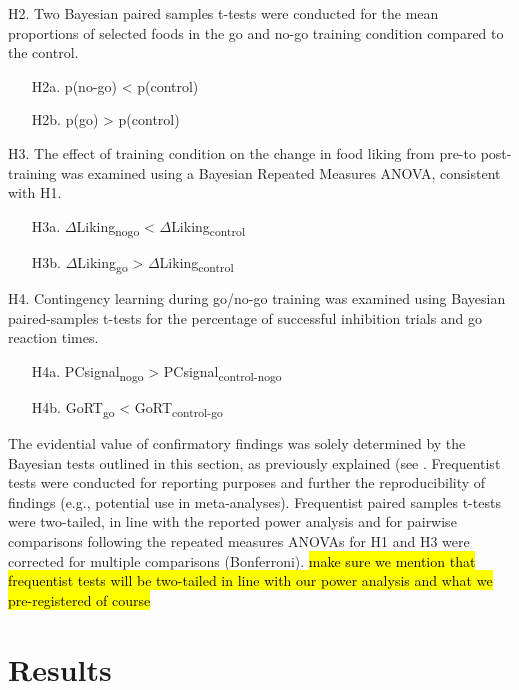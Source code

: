 \documentclass[man,floatsintext]{apa6}
\begin{document}
\noindent H2. Two Bayesian paired samples t-tests were conducted for the mean proportions of selected foods in the go and no-go training condition compared to the control.

\begin{itemize}
\item[H2a.] p(no-go) < p(control)
\item[H2b.] p(go) > p(control)
\end{itemize}

\noindent H3. The effect of training condition on the change in food liking from pre-to post-training was examined using a Bayesian Repeated Measures ANOVA, consistent with H1.

\begin{itemize}
\item[H3a.] $\Delta$Liking\textsubscript{nogo} < $\Delta$Liking\textsubscript{control}
\item[H3b.] $\Delta$Liking\textsubscript{go} > $\Delta$Liking\textsubscript{control}
\end{itemize}

\noindent H4. Contingency learning during go/no-go training was examined using Bayesian paired-samples t-tests for the percentage of successful inhibition trials and go reaction times.

\begin{itemize}
\item[H4a.] PCsignal\textsubscript{nogo} > PCsignal\textsubscript{control-nogo}
\item[H4b.] GoRT\textsubscript{go} < GoRT\textsubscript{control-go}
\end{itemize}

The evidential value of confirmatory findings was solely determined by the Bayesian tests outlined in this section, as previously explained (see \textit{}. Frequentist tests were conducted for reporting purposes and further the reproducibility of findings (e.g., potential use in meta-analyses). Frequentist paired samples t-tests were two-tailed, in line with the reported power analysis and for pairwise comparisons following the repeated measures ANOVAs for H1 and H3 were corrected for multiple comparisons (Bonferroni).
\hl{make sure we mention that frequentist tests will be two-tailed in line with our power analysis and what we pre-registered of course}

\hypertarget{results}{%
\section{Results}\label{results}}
\end{document}
